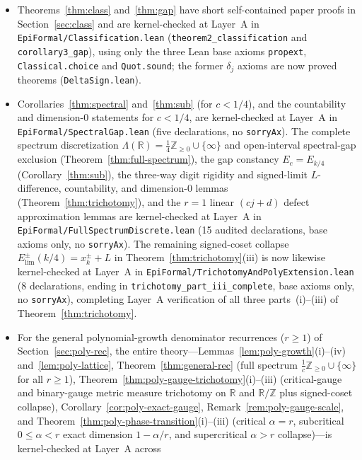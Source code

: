 \documentclass[11pt]{article}
\theoremstyle{definition}
\theoremstyle{remark}
\newcommand{\R}{\mathbb{R}}
\newcommand{\Z}{\mathbb{Z}}
\newcommand{\Lam}{\Lambda}
\begin{document}
\begin{itemize}[leftmargin=1.5em]
\item Theorems~\ref{thm:class} and~\ref{thm:gap} have short self-contained paper
proofs in Section~\ref{sec:class} and are kernel-checked at Layer~A in
\texttt{EpiFormal/\allowbreak Classification.lean}
(\texttt{theorem2\_classification} and \texttt{corollary3\_gap}), using only the
three Lean base axioms \texttt{propext}, \texttt{Classical.choice} and
\texttt{Quot.sound}; the former $\delta_j$ axioms are now proved theorems
(\texttt{DeltaSign.lean}).
\item Corollaries~\ref{thm:spectral} and~\ref{thm:sub} (for $c<1/4$), and the
countability and dimension-$0$ statements for $c<1/4$, are kernel-checked at
Layer~A in \texttt{EpiFormal/\allowbreak SpectralGap.lean} (five declarations,
no \texttt{sorryAx}). The complete spectrum discretization
$\Lam(\R)=\frac14\Z_{\ge0}\cup\{\infty\}$ and open-interval spectral-gap
exclusion (Theorem~\ref{thm:full-spectrum}), the gap constancy $E_c=E_{k/4}$
(Corollary~\ref{thm:sub}), the three-way digit rigidity and signed-limit
$L$-difference, countability, and dimension-$0$ lemmas
(Theorem~\ref{thm:trichotomy}), and the $r=1$ linear $(cj+d)$ defect
approximation lemmas are kernel-checked at Layer~A in
\texttt{EpiFormal/\allowbreak FullSpectrumDiscrete.lean} (15 audited
declarations, base axioms only, no \texttt{sorryAx}). The remaining signed-coset
collapse $E_{\mathrm{lim}}^\pm(k/4)=x_k^\pm+L$ in
Theorem~\ref{thm:trichotomy}(iii) is now likewise kernel-checked at Layer~A in
\texttt{EpiFormal/\allowbreak TrichotomyAndPolyExtension.lean} (8 declarations,
ending in \texttt{trichotomy\_\allowbreak part\_\allowbreak iii\_\allowbreak complete},
base axioms only, no \texttt{sorryAx}), completing Layer~A verification of all
three parts~(i)--(iii) of Theorem~\ref{thm:trichotomy}.
\item For the general polynomial-growth denominator recurrences ($r\ge1$) of
Section~\ref{sec:poly-rec}, the entire theory---Lemmas~\ref{lem:poly-growth}(i)--(iv)
and~\ref{lem:poly-lattice}, Theorem~\ref{thm:general-rec} (full spectrum
$\frac{1}{c}\Z_{\ge0}\cup\{\infty\}$ for all $r\ge1$),
Theorem~\ref{thm:poly-gauge-trichotomy}(i)--(iii) (critical-gauge and
binary-gauge metric measure trichotomy on $\R$ and $\R/\Z$ plus signed-coset
collapse), Corollary~\ref{cor:poly-exact-gauge},
Remark~\ref{rem:poly-gauge-scale}, and
Theorem~\ref{thm:poly-phase-transition}(i)--(iii) (critical $\alpha=r$,
subcritical $0\le\alpha<r$ exact dimension $1-\alpha/r$, and supercritical
$\alpha>r$ collapse)---is kernel-checked at Layer~A across

\end{itemize}
\end{document}
